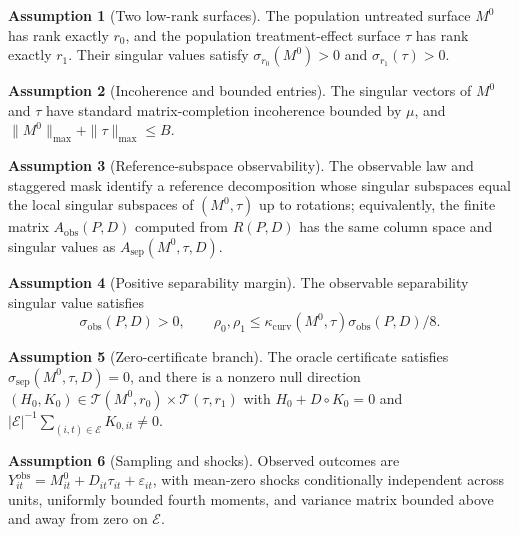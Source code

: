 \documentclass[11pt]{article}
\theoremstyle{definition}
\newtheorem{assumption}{Assumption}
\theoremstyle{plain}
\theoremstyle{remark}
\begin{document}
\begin{assumption}[Two low-rank surfaces]\label{ass:two-rank}
The population untreated surface \(M^0\) has rank exactly \(r_0\), and the population treatment-effect surface \(\tau\) has rank exactly \(r_1\).  Their singular values satisfy \(\sigma_{r_0}(M^0)>0\) and \(\sigma_{r_1}(\tau)>0\).
\end{assumption}

\begin{assumption}[Incoherence and bounded entries]\label{ass:incoherence}
The singular vectors of \(M^0\) and \(\tau\) have standard matrix-completion incoherence bounded by \(\mu\), and \(\|M^0\|_{\max}+\|\tau\|_{\max}\le B\).
\end{assumption}

\begin{assumption}[Reference-subspace observability]\label{ass:reference-subspaces}
The observable law and staggered mask identify a reference decomposition whose singular subspaces equal the local singular subspaces of \((M^0,\tau)\) up to rotations; equivalently, the finite matrix \(A_{\mathrm{obs}}(P,D)\) computed from \(R(P,D)\) has the same column space and singular values as \(A_{\mathrm{sep}}(M^0,\tau,D)\).
\end{assumption}

\begin{assumption}[Positive separability margin]\label{ass:sep-margin}
The observable separability singular value satisfies
\[
\sigma_{\mathrm{obs}}(P,D)>0,\qquad
\rho_0,\rho_1\le \kappa_{\mathrm{curv}}(M^0,\tau)\sigma_{\mathrm{obs}}(P,D)/8.
\]
\end{assumption}

\begin{assumption}[Zero-certificate branch]\label{ass:zero-certificate}
The oracle certificate satisfies \(\sigma_{\mathrm{sep}}(M^0,\tau,D)=0\), and there is a nonzero null direction \((H_0,K_0)\in\mathcal T(M^0,r_0)\times\mathcal T(\tau,r_1)\) with \(H_0+D\circ K_0=0\) and \(|\mathcal E|^{-1}\sum_{(i,t)\in\mathcal E}K_{0,it}\ne 0\).
\end{assumption}

\begin{assumption}[Sampling and shocks]\label{ass:sampling}
Observed outcomes are \(Y^{\mathrm{obs}}_{it}=M^0_{it}+D_{it}\tau_{it}+\varepsilon_{it}\), with mean-zero shocks conditionally independent across units, uniformly bounded fourth moments, and variance matrix bounded above and away from zero on \(\mathcal E\).
\end{assumption}
\end{document}
